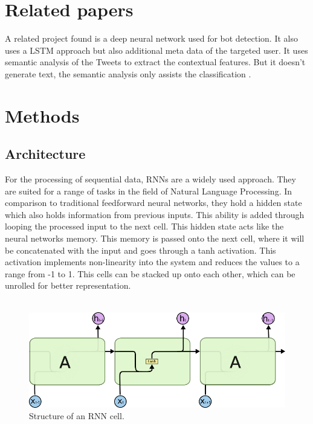 \documentclass[conference]{IEEEtran}
\begin{document}
\section{Related papers}

A related project found is a deep neural network used for bot detection. It also uses a LSTM approach but also additional meta data of the targeted user. It uses semantic analysis of the Tweets to extract the contextual features. But it doesn’t generate text, the semantic analysis only assists the classification \cite{tim2}.

\section{Methods}

\subsection{Architecture}

For the processing of sequential data, RNNs are a widely used approach. They are suited for a range of tasks in the field of Natural Language Processing. In comparison to traditional feedforward neural networks, they hold a hidden state which also holds information from previous inputs. This ability is added through looping the processed input to the next cell. This hidden state acts like the neural networks memory. This memory is passed onto the next cell, where it will be concatenated with the input and goes through a tanh activation. This activation implements non-linearity into the system and reduces the values to a range from -1 to 1. This cells can be stacked up onto each other, which can be unrolled for better representation.\\
\\

\begin{figure}[htbp]
\centerline{\includegraphics{pictures/structure_rnn.png}}
\caption{Structure of an RNN cell.}
\label{fig:structure_rnn}
\end{figure}
\end{document}
